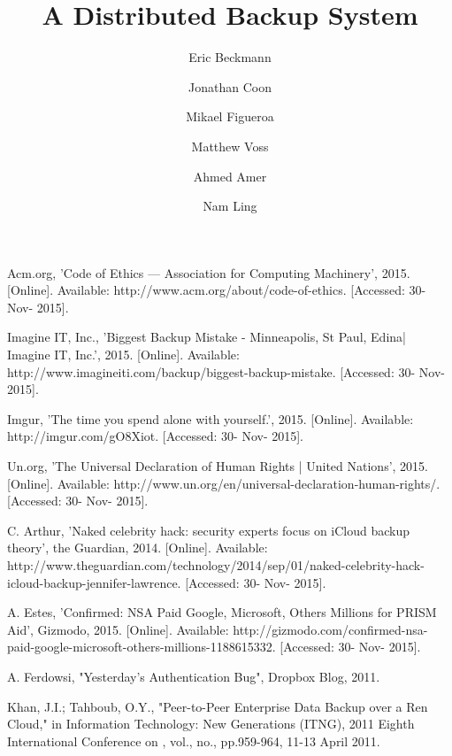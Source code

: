\documentclass{scu-thesis}
\author{Eric Beckmann}
\author{Jonathan Coon}
\author{Mikael Figueroa}
\author{Matthew Voss}
\title{A Distributed Backup System}
\begin{document}
\frontmatter
\signature{Ahmed Amer}
\signature{Nam Ling}

\maketitle



\tableofcontents
\listoffigures

\mainmatter











%
%

\begin{thebibliography}{9}

Acm.org, 'Code of Ethics            —                Association for Computing Machinery', 2015. [Online]. Available: http://www.acm.org/about/code-of-ethics. [Accessed: 30- Nov- 2015].

Imagine IT, Inc., 'Biggest Backup Mistake - Minneapolis, St Paul, Edina| Imagine IT, Inc.', 2015. [Online]. Available: http://www.imagineiti.com/backup/biggest-backup-mistake. [Accessed: 30- Nov- 2015].

Imgur, 'The time you spend alone with yourself.', 2015. [Online]. Available: http://imgur.com/gO8Xiot. [Accessed: 30- Nov- 2015].

Un.org, 'The Universal Declaration of Human Rights | United Nations', 2015. [Online]. Available: http://www.un.org/en/universal-declaration-human-rights/. [Accessed: 30- Nov- 2015].

C.  Arthur, 'Naked celebrity hack: security experts focus on iCloud backup theory', the Guardian, 2014. [Online]. Available: http://www.theguardian.com/technology/2014/sep/01/naked-celebrity-hack-icloud-backup-jennifer-lawrence. [Accessed: 30- Nov- 2015].

A.  Estes, 'Confirmed: NSA Paid Google, Microsoft, Others Millions for PRISM Aid', Gizmodo, 2015. [Online]. Available: http://gizmodo.com/confirmed-nsa-paid-google-microsoft-others-millions-1188615332. [Accessed: 30- Nov- 2015].

A.  Ferdowsi, "Yesterday's Authentication Bug", Dropbox Blog, 2011.

Khan, J.I.; Tahboub, O.Y., "Peer-to-Peer Enterprise Data Backup over a Ren Cloud," in Information Technology: New Generations (ITNG), 2011 Eighth International Conference on , vol., no., pp.959-964, 11-13 April 2011.


\end{thebibliography}
\end{document}
